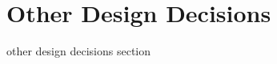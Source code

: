 \documentclass[../../../../dd.tex]{subfiles}
\begin{document}
	\section{Other Design Decisions}

	other design decisions section
	
\end{document}
